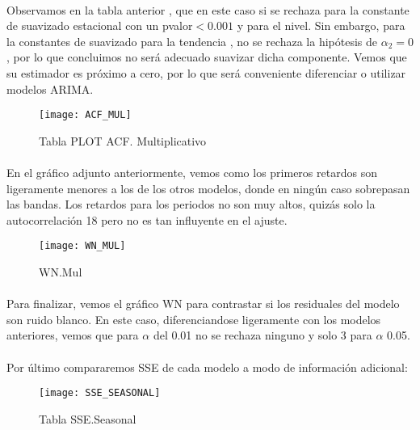 \documentclass[a4paper, spanish]{article}
\begin{document}
      \paragraph{}
      Observamos en la tabla anterior , que en este caso si se rechaza para la constante de suavizado estacional con un pvalor$ <0.001$ y para el nivel. Sin embargo, para la constantes de suavizado para la tendencia , no se rechaza la hipótesis de $\alpha_2 =0$, por lo que concluimos no será adecuado suavizar dicha componente. Vemos que su estimador es próximo a cero, por lo que será conveniente diferenciar o utilizar modelos ARIMA.

      \begin{figure}[h]
        \centering
        \texttt{[image: ACF\_MUL]}
        \caption{Tabla PLOT ACF. Multiplicativo}
        \label{}
      \end{figure}

      \paragraph{}
      En el gráfico adjunto anteriormente, vemos como los primeros retardos son ligeramente menores a los de los otros modelos, donde en ningún caso sobrepasan las bandas. Los retardos para los periodos no son muy altos, quizás solo la autocorrelación 18 pero no es tan influyente en el ajuste.

      \begin{figure}[h]
        \centering
        \texttt{[image: WN\_MUL]}
        \caption{WN.Mul}
        \label{}
      \end{figure}

      \paragraph{}
      Para finalizar, vemos el gráfico WN para contrastar si los residuales del modelo son ruido blanco. En este caso, diferenciandose ligeramente con los modelos anteriores, vemos que para $\alpha$ del 0.01 no se rechaza ninguno y solo 3 para $\alpha$ 0.05.

      \paragraph{}
      Por último compararemos SSE de cada modelo a modo de información adicional:

      \begin{figure}[h]
        \centering
        \texttt{[image: SSE\_SEASONAL]}
        \caption{Tabla SSE.Seasonal}
        \label{}
      \end{figure}
\end{document}
